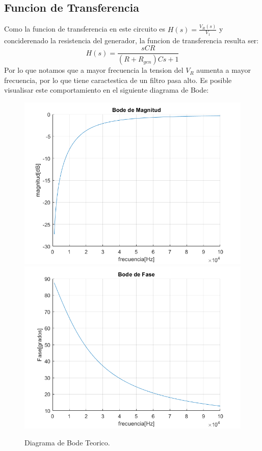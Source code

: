 \subsection{Funcion de Transferencia}

Como la funcion de transferencia en este circuito es $H(s) = \frac{V_R(s)}{V_1}$ y conciderenado la resistencia del generador, la funcion de transferencia resulta ser:
$$H(s) = \frac{sCR}{\left(R+R_{gen}\right)Cs+1}$$
Por lo que notamos que a mayor frecuencia la tension del $V_R$ aumenta a mayor frecuencia, por lo que tiene caractestica de un filtro pasa alto. Es posible visualisar este comportamiento en el siguiente diagrama de Bode:

\begin{figure}[h!]
\centering
\includegraphics[scale=0.5]{2teomag.png}
\includegraphics[scale=0.5]{2teofase.png}
\caption{Diagrama de Bode Teorico.}
\label{fig:CR}
\end{figure}

